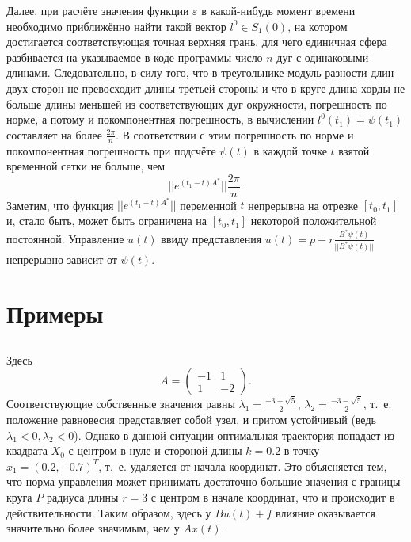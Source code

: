 \documentclass[12pt,titlepage]{article}
\begin{document}
Далее, при расчёте значения функции $ \varepsilon $ в какой-нибудь момент времени необходимо приближённо найти
такой вектор $ l^{0} \in S_{1}(0) $, на котором достигается соответствующая точная верхняя грань, для чего
единичная сфера разбивается на указываемое в коде программы число $ n $ дуг с одинаковыми длинами. Следовательно,
в силу того, что в треугольнике модуль разности длин двух сторон не превосходит длины третьей стороны и что в
круге длина хорды не больше длины меньшей из соответствующих дуг окружности, погрешность по норме, а потому и
покомпонентная погрешность, в вычислении $ l^{0}(t_{1}) = \psi(t_{1}) $ составляет на более $ \frac{2\pi}{n} $.
В соответствии с этим погрешность по норме и покомпонентная погрешность при подсчёте $ \psi(t) $ в каждой
точке $ t $ взятой временной сетки не больше, чем
$$
|| e^{ (t_{1} - t)A^{*} } || \frac{2\pi}{n}.
$$
Заметим, что функция $ || e^{ (t_{1} - t)A^{*} } || $ переменной $ t $ непрерывна на отрезке $ [ t_{0}, t_{1} ] $
и, стало быть, может быть ограничена на $ [ t_{0}, t_{1} ] $ некоторой положительной постоянной. Управление
$ u(t) $ ввиду представления $ u(t) = p + r \frac{ B^{*}\psi(t) }{ || B^{*}\psi(t) || } $ непрерывно зависит
от $ \psi(t) $.


\newpage
\section{Примеры}

\subsection{}

Здесь
$$
A = \left( \begin{array}{cc}
      -1 & 1 \\
      1 & -2
    \end{array} \right).
$$
Соответствующие собственные значения равны $ \lambda_{1} = \frac{ -3 + \sqrt{5} }{2} $,
$ \lambda_{2} = \frac{ -3 - \sqrt{5} }{2} $, т.~е. положение равновесия представляет собой узел, и притом
устойчивый (ведь $ \lambda_{1} < 0, \lambda_{2} < 0 $). Однако в данной ситуации оптимальная траектория
попадает из квадрата $ X_{0} $ с центром в нуле и стороной длины $ k = 0.2 $ в точку
$ x_{1} = (0.2, -0.7)^{T} $, т.~е. удаляется от начала координат. Это объясняется тем, что норма управления
может принимать достаточно большие значения с границы круга $ P $ радиуса длины $ r = 3 $ с центром
в начале координат, что и происходит в действительности. Таким образом, здесь у $ Bu(t) + f $ влияние
оказывается значительно более значимым, чем у $ Ax(t) $.
\end{document}

